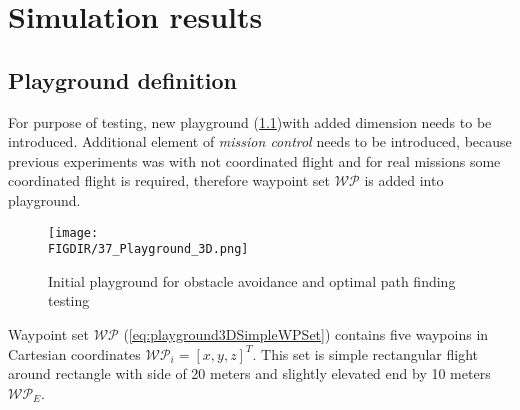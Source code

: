 \chapter{Simulation results}\label{ch:simulationResults}

\section{Playground definition}\label{ch:3DPlaygroundDefinition}
\noindent For purpose of testing, new playground (\ref{fig:new3DPlayground})with added dimension needs to be introduced. Additional element of \textit{mission control} needs to be introduced, because previous experiments was with not coordinated flight and for real missions some coordinated flight is required, therefore waypoint set $\mathscr{WP}$ is added into playground. 
\begin{figure}[H]
    \centering
    \texttt{[image: \\FIGDIR/37\_Playground\_3D.png]}
    \caption{Initial playground for obstacle avoidance and optimal path finding testing}
    \label{fig:new3DPlayground}
\end{figure}
\noindent Waypoint set $\mathscr{WP}$ (\ref{eq:playground3DSimpleWPSet}) contains five waypoins in Cartesian coordinates $\mathscr{WP}_i =[x,y,z]^T$. This set is simple rectangular flight around rectangle with side of 20 meters and slightly elevated end by 10 meters $\mathscr{WP}_E$.

